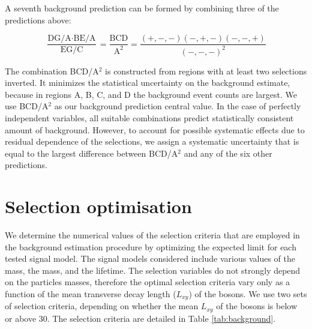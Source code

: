 

A seventh background prediction can be formed by combining three of the predictions above:

\begin{equation}
\frac{\text{DG/A}\cdot\text{BE/A}}{\text{EG/C}} = \frac{\text{BCD}}{\text{A}^2} = \frac{(+,-,-)(-,+,-)(-,-,+)}{(-,-,-)^2}
\end{equation}


The combination BCD/A$^2$ is constructed from regions with at least two selections inverted.
It minimizes the statistical uncertainty on the background estimate, because in regions 
A, B, C, and D
the background event counts are largest. We use BCD/A$^2$ as our background prediction
central value.
In the case of perfectly independent 
variables, all suitable combinations predict statistically consistent  amount of background. 
However, to account for possible systematic
effects due to residual dependence of the selections, we assign a systematic uncertainty 
that is equal to the largest difference 
between BCD/A$^2$ and any of the six other predictions.

\section{Selection optimisation}
\label{sec:cutvalues}
We determine the numerical values of the selection criteria that are employed in the background estimation procedure 
by optimizing the expected limit for each tested signal model.
The signal models considered include various values of the \Higgs mass, the \X mass, and the \X lifetime.
The selection variables
do not strongly depend on the particles masses, therefore the optimal selection criteria
vary only as a function of the
mean transverse decay length ($L_{xy}$)
of the \X bosons. We use two sets of selection criteria,
depending on whether the mean
$L_{xy}$ of the \X bosons is below or above 30\cm. The selection criteria are
detailed in Table \ref{tab:background}.

